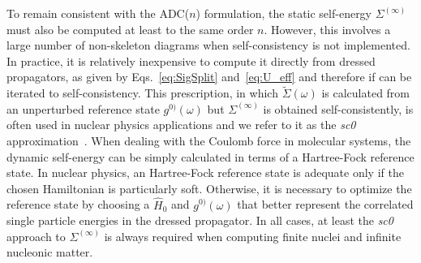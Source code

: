 To remain consistent with the ADC($n$) formulation,  the static self-energy $\Sigma^{(\infty)}$ must also be computed at least to the same order $n$. However, this involves a large number of non-skeleton diagrams when self-consistency is not implemented. In practice, it is relatively inexpensive to compute it directly from dressed propagators, as given by Eqs.~\eqref{eq:SigSplit} and~\eqref{eq:U_eff} and therefore if can be iterated to self-consistency.
This prescription, in which $\widetilde\Sigma(\omega)$ is calculated from an unperturbed reference state $g^{0)}(\omega)$ but $\Sigma^{(\infty)}$
is obtained self-consistently, is often used in nuclear physics applications and we refer to it as the {\em sc0} approximation~\cite{ch11_Soma2014Lanc}.
When dealing with the Coulomb force in molecular systems, the dynamic self-energy can be simply calculated in terms of a Hartree-Fock reference state.  In nuclear physics, an Hartree-Fock reference state is adequate only if the chosen Hamiltonian is particularly soft.  Otherwise, it is necessary to optimize the reference state by choosing a $\widehat{H}_0$ and $g^{0)}(\omega)$  that better represent the correlated single particle energies in the dressed propagator. In all cases, at least the {\em sc0} approach to $\Sigma^{(\infty)}$ is always required when computing finite nuclei and infinite nucleonic matter.

